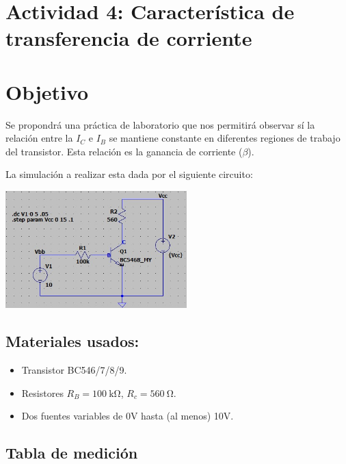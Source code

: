 \newpage

\section{Actividad 4: Característica de transferencia de corriente}

\section*{Objetivo}
Se propondrá una práctica de laboratorio que nos permitirá observar sí la relación
entre la $I_C$ e $I_B$ se mantiene constante en diferentes regiones de trabajo del transistor. Esta
relación es la ganancia de corriente ($\beta$).

La simulación a realizar esta dada por el siguiente circuito:

\includegraphics[width=7cm]{./imagenes/Circuito4.jpg}


\subsection{Materiales usados:}

\begin{itemize}
    \item Transistor BC546/7/8/9.
    \item Resistores $R_B = \SI{100}{\kilo\ohm}$, $R_c = \SI{560}{\ohm}$.
    \item Dos fuentes variables de 0V hasta (al menos) 10V.
\end{itemize}

\subsection{Tabla de medición}

\begin{table}[ht]
\end{table}

